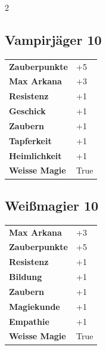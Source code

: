 \begin{multicols}{2}
\begin{tcolorbox}

\end{tcolorbox}

\begin{tcolorbox}
    \subsection*{Vampirjäger \hfill \small{10 }}
    \tcblower




\begin{tabular}{@{}ll@{}}
    \textbf{Zauberpunkte} & +5\\
    \textbf{Max Arkana} & +3\\
    \textbf{Resistenz} & +1\\
    \textbf{Geschick} & +1\\
    \textbf{Zaubern} & +1\\
    \textbf{Tapferkeit} & +1\\
    \textbf{Heimlichkeit} & +1\\
    \textbf{Weisse Magie} & True\\
\end{tabular}


\end{tcolorbox}

\begin{tcolorbox}
    \subsection*{Weißmagier \hfill \small{10 }}
    \tcblower




\begin{tabular}{@{}ll@{}}
    \textbf{Max Arkana} & +3\\
    \textbf{Zauberpunkte} & +5\\
    \textbf{Resistenz} & +1\\
    \textbf{Bildung} & +1\\
    \textbf{Zaubern} & +1\\
    \textbf{Magiekunde} & +1\\
    \textbf{Empathie} & +1\\
    \textbf{Weisse Magie} & True\\
\end{tabular}


\end{tcolorbox}
\end{multicols}
